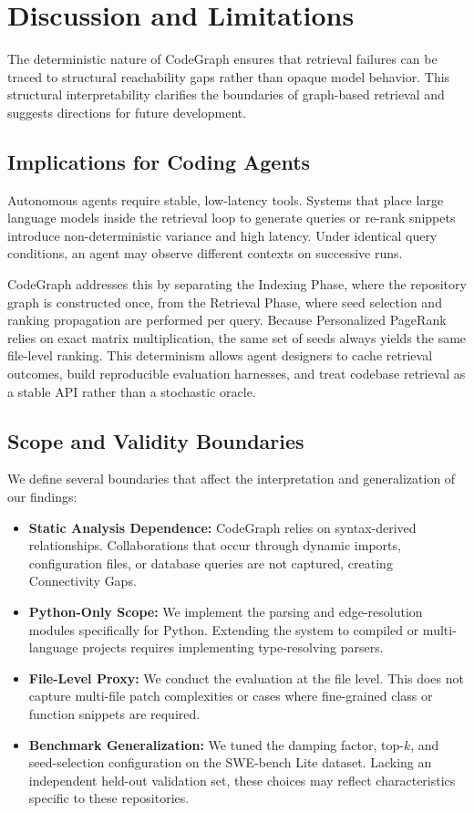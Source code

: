 \section{Discussion and Limitations}
\label{sec:discussion}

The deterministic nature of CodeGraph ensures that retrieval failures can be traced to structural reachability gaps rather than opaque model behavior. This structural interpretability clarifies the boundaries of graph-based retrieval and suggests directions for future development.

\subsection{Implications for Coding Agents}

Autonomous agents require stable, low-latency tools. Systems that place large language models inside the retrieval loop to generate queries or re-rank snippets introduce non-deterministic variance and high latency. Under identical query conditions, an agent may observe different contexts on successive runs.

CodeGraph addresses this by separating the Indexing Phase, where the repository graph is constructed once, from the Retrieval Phase, where seed selection and ranking propagation are performed per query. Because Personalized PageRank relies on exact matrix multiplication, the same set of seeds always yields the same file-level ranking. This determinism allows agent designers to cache retrieval outcomes, build reproducible evaluation harnesses, and treat codebase retrieval as a stable API rather than a stochastic oracle.

\subsection{Scope and Validity Boundaries}

We define several boundaries that affect the interpretation and generalization of our findings:
\begin{itemize}
    \item \textbf{Static Analysis Dependence:} CodeGraph relies on syntax-derived relationships. Collaborations that occur through dynamic imports, configuration files, or database queries are not captured, creating Connectivity Gaps.
    \item \textbf{Python-Only Scope:} We implement the parsing and edge-resolution modules specifically for Python. Extending the system to compiled or multi-language projects requires implementing type-resolving parsers.
    \item \textbf{File-Level Proxy:} We conduct the evaluation at the file level. This does not capture multi-file patch complexities or cases where fine-grained class or function snippets are required.
    \item \textbf{Benchmark Generalization:} We tuned the damping factor, top-$k$, and seed-selection configuration on the SWE-bench Lite dataset. Lacking an independent held-out validation set, these choices may reflect characteristics specific to these repositories.
\end{itemize}

